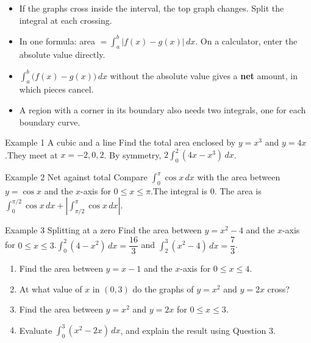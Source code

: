 \documentclass[11pt]{article}
\begin{document}

\begin{ideabox}
\begin{itemize}[leftmargin=*,itemsep=2pt,topsep=2pt]
  \item If the graphs cross inside the interval, the top graph changes. Split the integral at each crossing.
  \item In one formula: area $=\displaystyle\int_{a}^{b}|f(x)-g(x)|\,dx$. On a calculator, enter the absolute value directly.
  \item $\displaystyle\int_{a}^{b}\big(f(x)-g(x)\big)\,dx$ without the absolute value gives a \textbf{net} amount, in which pieces cancel.
  \item A region with a corner in its boundary also needs two integrals, one for each boundary curve.
\end{itemize}
\end{ideabox}

\begin{example}{Example 1 \textperiodcentered{} A cubic and a line}
Find the total area enclosed by $y=x^3$ and $y=4x$.\soln They meet at $x=-2,0,2$. By symmetry, $2\displaystyle\int_{0}^{2}(4x-x^3)\,dx$.
\end{example}

\begin{example}{Example 2 \textperiodcentered{} Net against total}
Compare $\displaystyle\int_{0}^{\pi}\cos x\,dx$ with the area between $y=\cos x$ and the $x$-axis for $0\le x\le\pi$.\soln The integral is 0. The area is $\int_{0}^{\pi/2}\cos x\,dx+\left|\int_{\pi/2}^{\pi}\cos x\,dx\right|$.
\end{example}

\begin{example}{Example 3 \textperiodcentered{} Splitting at a zero}
Find the area between $y=x^2-4$ and the $x$-axis for $0\le x\le3$.\soln $\displaystyle\int_{0}^{2}(4-x^2)\,dx=\dfrac{16}{3}$ and $\displaystyle\int_{2}^{3}(x^2-4)\,dx=\dfrac73$.
\end{example}

\newpage
{}

\begin{enumerate}[leftmargin=*,itemsep=2pt]
  \item Find the area between $y=x-1$ and the $x$-axis for $0\le x\le4$.\work{2.3cm}
  \item At what value of $x$ in $(0,3)$ do the graphs of $y=x^2$ and $y=2x$ cross?\work{2.3cm}
  \item Find the area between $y=x^2$ and $y=2x$ for $0\le x\le3$.\work{2.3cm}
  \item Evaluate $\displaystyle\int_{0}^{3}(x^2-2x)\,dx$, and explain the result using Question 3.\work{2.3cm}
\end{enumerate}
\end{document}
